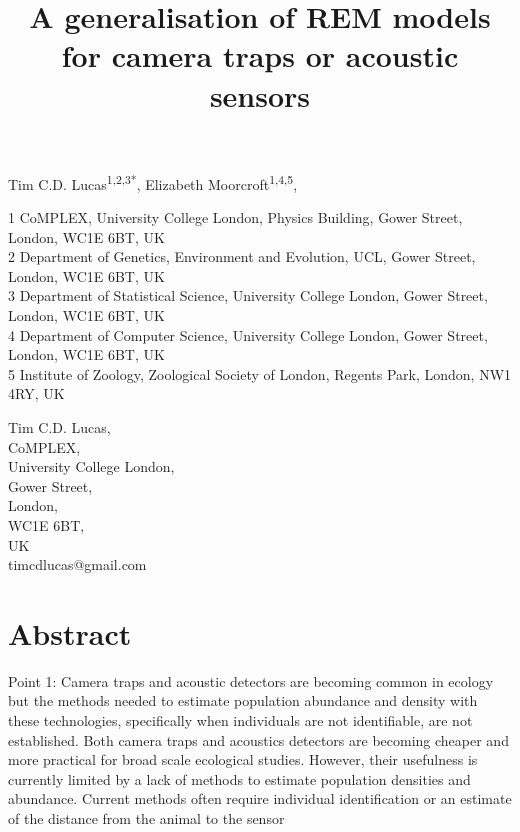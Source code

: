 \documentclass[a4paper,10pt,reqno,oneside]{amsart}
\begin{document}
\title{A generalisation of REM models for camera traps or acoustic sensors}
\maketitle



Tim C.D. Lucas\textsuperscript{1,2,3*}, Elizabeth Moorcroft\textsuperscript{1,4,5}, %


1 CoMPLEX, University College London, Physics Building, Gower Street, London, WC1E 6BT, UK\\ 
2 Department of Genetics, Environment and Evolution, UCL, Gower Street, London, WC1E 6BT, UK\\ 
3 Department of Statistical Science, University College London, Gower Street, London, WC1E 6BT, UK\\ 
4 Department of Computer Science, University College London, Gower Street, London, WC1E 6BT, UK\\ 
5 Institute of Zoology, Zoological Society of London, Regents Park, London, NW1 4RY, UK


Tim C.D. Lucas,\\
CoMPLEX,\\
University College London,\\
Gower Street,\\
London,\\
WC1E 6BT, \\
UK\\
timcdlucas@gmail.com\\


\clearpage



\section{Abstract}
Point 1: Camera traps and acoustic detectors are becoming common in ecology but the methods needed to estimate population abundance and density with these technologies, specifically when individuals are not identifiable, are not established. Both camera traps and acoustics detectors are becoming cheaper and more practical for broad scale ecological studies. However, their usefulness is currently limited by a lack of methods to estimate population densities and abundance. Current methods often require individual identification or an estimate of the distance from the animal to the sensor
\end{document}
